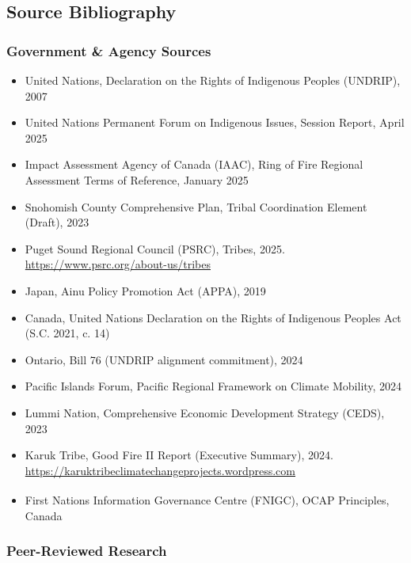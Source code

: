 \documentclass[11pt,letterpaper]{article}
\begin{document}
\subsection{Source Bibliography}

\subsubsection{Government \& Agency Sources}

\begin{itemize}
  \item United Nations, Declaration on the Rights of Indigenous Peoples (UNDRIP), 2007
  \item United Nations Permanent Forum on Indigenous Issues, Session Report, April 2025
  \item Impact Assessment Agency of Canada (IAAC), Ring of Fire Regional Assessment Terms of Reference, January 2025
  \item Snohomish County Comprehensive Plan, Tribal Coordination Element (Draft), 2023
  \item Puget Sound Regional Council (PSRC), Tribes, 2025. \url{https://www.psrc.org/about-us/tribes}
  \item Japan, Ainu Policy Promotion Act (APPA), 2019
  \item Canada, United Nations Declaration on the Rights of Indigenous Peoples Act (S.C. 2021, c. 14)
  \item Ontario, Bill 76 (UNDRIP alignment commitment), 2024
  \item Pacific Islands Forum, Pacific Regional Framework on Climate Mobility, 2024
  \item Lummi Nation, Comprehensive Economic Development Strategy (CEDS), 2023
  \item Karuk Tribe, Good Fire II Report (Executive Summary), 2024. \url{https://karuktribeclimatechangeprojects.wordpress.com}
  \item First Nations Information Governance Centre (FNIGC), OCAP\textsuperscript{\textregistered} Principles, Canada
\end{itemize}

\subsubsection{Peer-Reviewed Research}
\end{document}
